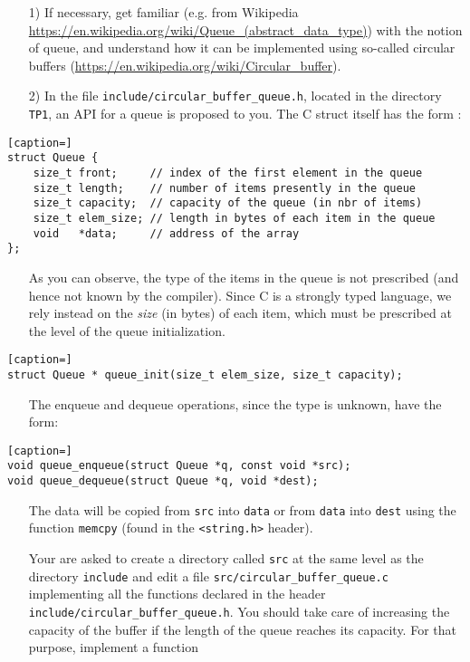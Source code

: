 \documentclass[a4paper,12pt]{article}
\begin{document}
\begin{enumerate}
	\item[1)] If necessary, get familiar (e.g. from Wikipedia  \url{https://en.wikipedia.org/wiki/Queue_(abstract_data_type)}) with the notion of queue, and understand how it can be implemented using so-called circular buffers (\url{https://en.wikipedia.org/wiki/Circular_buffer}).

	\item[2)] In the file {\tt include/circular\_buffer\_queue.h}, located in the directory {\tt TP1}, an API for a queue is proposed to you. The C struct itself has the form :
\end{enumerate}
\begin{lstlisting}[caption=]
struct Queue {
	size_t front;     // index of the first element in the queue
	size_t length;    // number of items presently in the queue
	size_t capacity;  // capacity of the queue (in nbr of items)
	size_t elem_size; // length in bytes of each item in the queue
	void   *data;     // address of the array
};
\end{lstlisting}
\begin{enumerate}
\item[] As you can observe, the type of the items in the queue is not prescribed (and hence not known by the compiler). Since C is a strongly typed language, we rely instead on the {\it size} (in bytes) of each item, which must be prescribed at the level of the queue initialization.
\end{enumerate}
\begin{lstlisting}[caption=]
struct Queue * queue_init(size_t elem_size, size_t capacity);
\end{lstlisting}
\begin{enumerate}
\item[] The enqueue and dequeue operations, since the type is unknown, have the form:
\end{enumerate}
\begin{lstlisting}[caption=]
void queue_enqueue(struct Queue *q, const void *src);
void queue_dequeue(struct Queue *q, void *dest);
\end{lstlisting}
\begin{enumerate}
	\item[] The data will be copied from {\tt src} into {\tt data} or from {\tt data} into {\tt dest} using the function {\tt memcpy} (found in the {\tt <string.h>} header).

Your are asked to create a directory called {\tt src} at the same level as the directory {\tt include} and edit a file {\tt src/circular\_buffer\_queue.c} implementing all the functions declared in the header 
{\tt include/circular\_buffer\_queue.h}. You should take care of increasing the capacity of the buffer if the length of the queue reaches its capacity. For that purpose, implement a function 
\end{enumerate}
\end{document}
